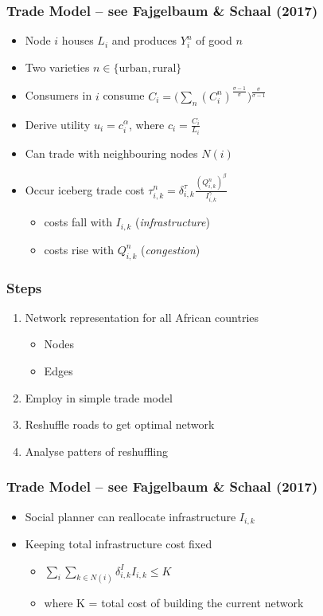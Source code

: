 \documentclass[]{beamer}   	%
\begin{document}
\begin{frame}
  \frametitle{Trade Model -- see Fajgelbaum \& Schaal (2017)}
  \begin{itemize}
    \item<1-> Node $i$ houses $L_{i}$ and produces $Y^{n}_{i}$ of good $n$
    \item<1-> Two varieties $n \in \{ \textrm{urban}, \textrm{rural} \}$
    \item<2-> Consumers in $i$ consume $C_{i} = \bigg( \sum_{n}^{} (C_{i}^{n})^{\frac{\sigma-1}{\sigma}}\bigg)^{\frac{\sigma}{\sigma-1}}$
    \item<2-> Derive utility $u_{i}=c_{i}^{\alpha}$, where $c_{i} = \frac{C_{i}}{L_{i}}$
    \item<3-> Can trade with neighbouring nodes $N(i)$
    \item<3-> Occur iceberg trade cost $\tau_{i,k}^{n} = \delta^{\tau}_{i,k} \frac{(Q_{i,k}^{n})^{\beta}}{I_{i,k}^{\gamma}}$
    \begin{itemize}
    	  \item<3-> costs fall with $I_{i,k}$ (\emph{infrastructure})
      \item<3-> costs rise with $Q_{i,k}^{n}$ (\emph{congestion})
    \end{itemize}
  \end{itemize}
\end{frame}

\begin{frame}
  \frametitle{Steps}
  \begin{enumerate}
    \item Network representation for all African countries
    \begin{itemize}
      \item Nodes
      \item Edges
    \end{itemize}
    \item Employ in simple trade model
    \item \alert{Reshuffle roads to get optimal network}
    \item Analyse patters of reshuffling
  \end{enumerate}
\end{frame}

\begin{frame}
  \frametitle{Trade Model -- see Fajgelbaum \& Schaal (2017)}
  \label{trade_model}
  \begin{itemize}
    \item Social planner can reallocate infrastructure $I_{i,k}$
    \item Keeping total infrastructure cost fixed
    \begin{itemize}
      \item $\sum_{i}^{}\sum_{k\in N(i)}^{}\delta^{I}_{i,k}I_{i,k} \leq K$
      \item where K = total cost of building the current network
    \end{itemize}
  \end{itemize}
  \hyperlink{backup:planners_problem}{}
\end{frame}
\end{document}
